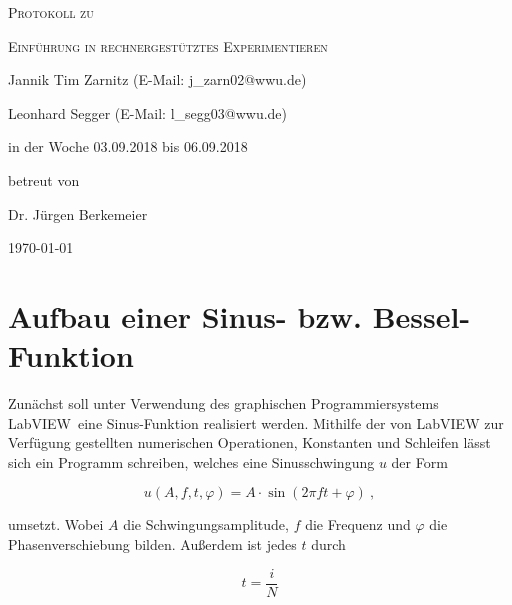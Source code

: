 \documentclass[
a4paper,
12pt,
pagesize,
ngerman
]{scrartcl}
\begin{document}
	
	\begin{titlepage}
		\centering
		{\scshape\LARGE Protokoll zu \par}
		\vspace{1cm}
		{\scshape\huge Einführung in rechnergestütztes Experimentieren \par}
		\vspace{3cm}
		
		{\large Jannik Tim Zarnitz (E-Mail: j\_zarn02@wwu.de) \par}
		{\large Leonhard Segger (E-Mail: l\_segg03@wwu.de) \par}
		\vfill
		
		in der Woche 03.09.2018 bis 06.09.2018\par
		betreut von\par
		{\large Dr. Jürgen Berkemeier}
		
		\vfill
		
		{\large \today\par}
	\end{titlepage}
	\tableofcontents
	\newpage

	\section{Aufbau einer Sinus- bzw. Bessel-Funktion} \label{sinusfkt}
	
	Zunächst soll unter Verwendung des graphischen Programmiersystems \glqq LabVIEW\grqq\ eine Sinus-Funktion realisiert werden. Mithilfe der von LabVIEW zur Verfügung gestellten numerischen Operationen, Konstanten und Schleifen lässt sich ein Programm schreiben, welches eine Sinusschwingung $u$ der Form
	
	\begin{equation} \label{u}
	u(A,f,t,\varphi) = A \cdot \sin(2\pi f t + \varphi) \ ,
	\end{equation}
	
	\noindent umsetzt. Wobei $A$ die Schwingungsamplitude, $f$ die Frequenz und $\varphi$ die Phasenverschiebung bilden. Außerdem ist jedes $t$ durch 
	
	\begin{equation} \label{t}
	t = \frac{i}{N}
	\end{equation}
	
\end{document}
